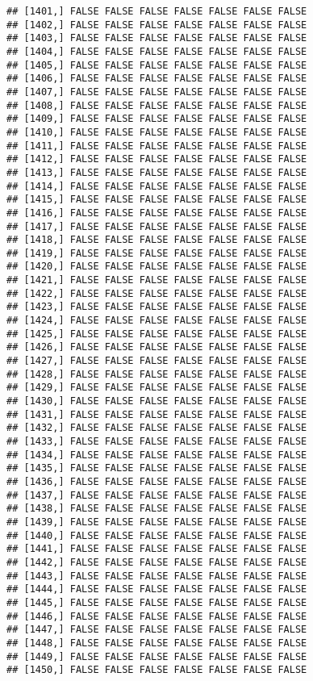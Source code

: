 \documentclass[
]{article}
\begin{document}
\begin{verbatim}
## [1401,] FALSE FALSE FALSE FALSE FALSE FALSE FALSE
## [1402,] FALSE FALSE FALSE FALSE FALSE FALSE FALSE
## [1403,] FALSE FALSE FALSE FALSE FALSE FALSE FALSE
## [1404,] FALSE FALSE FALSE FALSE FALSE FALSE FALSE
## [1405,] FALSE FALSE FALSE FALSE FALSE FALSE FALSE
## [1406,] FALSE FALSE FALSE FALSE FALSE FALSE FALSE
## [1407,] FALSE FALSE FALSE FALSE FALSE FALSE FALSE
## [1408,] FALSE FALSE FALSE FALSE FALSE FALSE FALSE
## [1409,] FALSE FALSE FALSE FALSE FALSE FALSE FALSE
## [1410,] FALSE FALSE FALSE FALSE FALSE FALSE FALSE
## [1411,] FALSE FALSE FALSE FALSE FALSE FALSE FALSE
## [1412,] FALSE FALSE FALSE FALSE FALSE FALSE FALSE
## [1413,] FALSE FALSE FALSE FALSE FALSE FALSE FALSE
## [1414,] FALSE FALSE FALSE FALSE FALSE FALSE FALSE
## [1415,] FALSE FALSE FALSE FALSE FALSE FALSE FALSE
## [1416,] FALSE FALSE FALSE FALSE FALSE FALSE FALSE
## [1417,] FALSE FALSE FALSE FALSE FALSE FALSE FALSE
## [1418,] FALSE FALSE FALSE FALSE FALSE FALSE FALSE
## [1419,] FALSE FALSE FALSE FALSE FALSE FALSE FALSE
## [1420,] FALSE FALSE FALSE FALSE FALSE FALSE FALSE
## [1421,] FALSE FALSE FALSE FALSE FALSE FALSE FALSE
## [1422,] FALSE FALSE FALSE FALSE FALSE FALSE FALSE
## [1423,] FALSE FALSE FALSE FALSE FALSE FALSE FALSE
## [1424,] FALSE FALSE FALSE FALSE FALSE FALSE FALSE
## [1425,] FALSE FALSE FALSE FALSE FALSE FALSE FALSE
## [1426,] FALSE FALSE FALSE FALSE FALSE FALSE FALSE
## [1427,] FALSE FALSE FALSE FALSE FALSE FALSE FALSE
## [1428,] FALSE FALSE FALSE FALSE FALSE FALSE FALSE
## [1429,] FALSE FALSE FALSE FALSE FALSE FALSE FALSE
## [1430,] FALSE FALSE FALSE FALSE FALSE FALSE FALSE
## [1431,] FALSE FALSE FALSE FALSE FALSE FALSE FALSE
## [1432,] FALSE FALSE FALSE FALSE FALSE FALSE FALSE
## [1433,] FALSE FALSE FALSE FALSE FALSE FALSE FALSE
## [1434,] FALSE FALSE FALSE FALSE FALSE FALSE FALSE
## [1435,] FALSE FALSE FALSE FALSE FALSE FALSE FALSE
## [1436,] FALSE FALSE FALSE FALSE FALSE FALSE FALSE
## [1437,] FALSE FALSE FALSE FALSE FALSE FALSE FALSE
## [1438,] FALSE FALSE FALSE FALSE FALSE FALSE FALSE
## [1439,] FALSE FALSE FALSE FALSE FALSE FALSE FALSE
## [1440,] FALSE FALSE FALSE FALSE FALSE FALSE FALSE
## [1441,] FALSE FALSE FALSE FALSE FALSE FALSE FALSE
## [1442,] FALSE FALSE FALSE FALSE FALSE FALSE FALSE
## [1443,] FALSE FALSE FALSE FALSE FALSE FALSE FALSE
## [1444,] FALSE FALSE FALSE FALSE FALSE FALSE FALSE
## [1445,] FALSE FALSE FALSE FALSE FALSE FALSE FALSE
## [1446,] FALSE FALSE FALSE FALSE FALSE FALSE FALSE
## [1447,] FALSE FALSE FALSE FALSE FALSE FALSE FALSE
## [1448,] FALSE FALSE FALSE FALSE FALSE FALSE FALSE
## [1449,] FALSE FALSE FALSE FALSE FALSE FALSE FALSE
## [1450,] FALSE FALSE FALSE FALSE FALSE FALSE FALSE

\end{verbatim}
\end{document}
